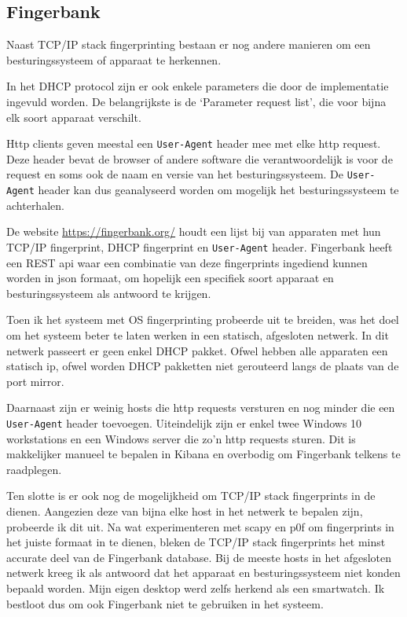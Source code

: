 \documentclass[a4paper,12pt]{report}
\begin{document}
\subsection{Fingerbank}
\label{sec:fingerbank}
Naast TCP/IP stack fingerprinting bestaan er nog andere manieren om een besturingssysteem of apparaat te herkennen.

In het DHCP protocol zijn er ook enkele parameters die door de implementatie ingevuld worden.
De belangrijkste is de `Parameter request list', die voor bijna elk soort apparaat verschilt.

Http clients geven meestal een \lstinline|User-Agent| header mee met elke http request.
Deze header bevat de browser of andere software die verantwoordelijk is voor de request en soms ook de naam en versie van het besturingssysteem.
De \lstinline|User-Agent| header kan dus geanalyseerd worden om mogelijk het besturingssysteem te achterhalen.

De website \url{https://fingerbank.org/} houdt een lijst bij van apparaten met hun TCP/IP fingerprint, DHCP fingerprint en \lstinline|User-Agent| header.
Fingerbank heeft een REST api waar een combinatie van deze fingerprints ingediend kunnen worden in json formaat, om hopelijk een specifiek soort apparaat en besturingssysteem als antwoord te krijgen.

Toen ik het systeem met OS fingerprinting probeerde uit te breiden, was het doel om het systeem beter te laten werken in een statisch, afgesloten netwerk.
In dit netwerk passeert er geen enkel DHCP pakket.
Ofwel hebben alle apparaten een statisch ip, ofwel worden DHCP pakketten niet gerouteerd langs de plaats van de port mirror.

Daarnaast zijn er weinig hosts die http requests versturen en nog minder die een \lstinline|User-Agent| header toevoegen.
Uiteindelijk zijn er enkel twee Windows 10 workstations en een Windows server die zo'n http requests sturen.
Dit is makkelijker manueel te bepalen in Kibana en overbodig om Fingerbank telkens te raadplegen.

Ten slotte is er ook nog de mogelijkheid om TCP/IP stack fingerprints in de dienen.
Aangezien deze van bijna elke host in het netwerk te bepalen zijn, probeerde ik dit uit.
Na wat experimenteren met scapy en p0f om fingerprints in het juiste formaat in te dienen, bleken de TCP/IP stack fingerprints het minst accurate deel van de Fingerbank database.
Bij de meeste hosts in het afgesloten netwerk kreeg ik als antwoord dat het apparaat en besturingssysteem niet konden bepaald worden.
Mijn eigen desktop werd zelfs herkend als een smartwatch.
Ik bestloot dus om ook Fingerbank niet te gebruiken in het systeem.
\end{document}
